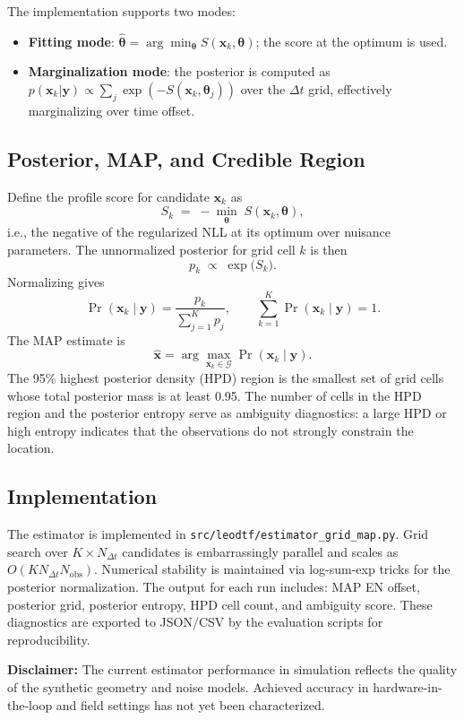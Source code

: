 The implementation supports two modes:
\begin{itemize}
  \item \textbf{Fitting mode}: $\hat{\boldsymbol{\theta}} = \arg\min_{\boldsymbol{\theta}}
        S(\mathbf{x}_k, \boldsymbol{\theta})$; the score at the optimum is used.
  \item \textbf{Marginalization mode}: the posterior is computed as
        $p(\mathbf{x}_k|\mathbf{y}) \propto \sum_j \exp(-S(\mathbf{x}_k, \boldsymbol{\theta}_j))$
        over the $\Delta t$ grid, effectively marginalizing over time offset.
\end{itemize}

\subsection{Posterior, MAP, and Credible Region}
Define the profile score for candidate $\mathbf{x}_k$ as
\begin{equation}
  S_k \;=\; -\min_{\boldsymbol{\theta}}\; S(\mathbf{x}_k, \boldsymbol{\theta}) ,
  \label{eq:profile_score}
\end{equation}
i.e., the negative of the regularized NLL at its optimum over nuisance
parameters.  The unnormalized posterior for grid cell $k$ is then
\begin{equation}
  p_k \;\propto\; \exp\!\bigl(S_k\bigr) .
  \end{equation}
Normalizing gives
\begin{equation}
  \Pr(\mathbf{x}_k \mid \mathbf{y})
  = \frac{p_k}{\sum_{j=1}^{K} p_j} ,
  \qquad
  \sum_{k=1}^{K} \Pr(\mathbf{x}_k \mid \mathbf{y}) = 1 .
  \label{eq:posterior}
\end{equation}
The MAP estimate is
\begin{equation}
  \hat{\mathbf{x}} = \arg\max_{\mathbf{x}_k \in \mathcal{G}} \Pr(\mathbf{x}_k \mid \mathbf{y}) .
  \label{eq:map_estimate}
\end{equation}
The 95\% highest posterior density (HPD) region is the smallest set of
grid cells whose total posterior mass is at least 0.95.  The number of cells
in the HPD region and the posterior entropy serve as ambiguity diagnostics:
a large HPD or high entropy indicates that the observations do not strongly
constrain the location.

\subsection{Implementation}
The estimator is implemented in \texttt{src/leodtf/estimator\_grid\_map.py}.
Grid search over $K \times N_{\Delta t}$ candidates is embarrassingly parallel
and scales as $O(K N_{\Delta t} N_{\text{obs}})$.  Numerical stability is
maintained via log-sum-exp tricks for the posterior normalization.  The output
for each run includes: MAP EN offset, posterior grid, posterior entropy,
HPD cell count, and ambiguity score.  These diagnostics are exported to
JSON/CSV by the evaluation scripts for reproducibility.

\textbf{Disclaimer:} The current estimator performance in simulation reflects
the quality of the synthetic geometry and noise models.  Achieved accuracy
in hardware-in-the-loop and field settings has not yet been characterized.